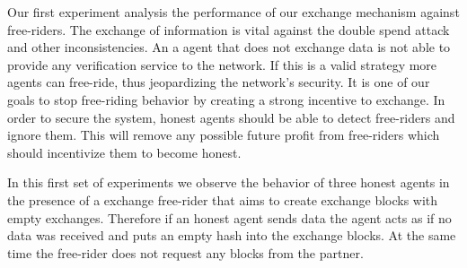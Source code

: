
Our first experiment analysis the performance of our exchange mechanism against free-riders. The 
exchange of information is vital against the double spend attack and other inconsistencies. An a
agent that does not exchange data is not able to provide any verification service to the network. If
this is a valid strategy more agents can free-ride, thus jeopardizing the network's security. It is 
one of our goals to stop free-riding behavior by creating a strong incentive to exchange. 
In order to secure the system, honest agents should be able to detect free-riders and ignore them.
This will remove any possible future profit from free-riders which should incentivize them to become honest.

In this first set of experiments we observe the behavior of three honest agents in the presence of 
a exchange free-rider that aims to create exchange blocks with empty exchanges. Therefore if an 
honest agent sends data the agent acts as if no data was received and puts an empty hash into the 
exchange blocks. At the same time the free-rider does not request any blocks from the partner.

